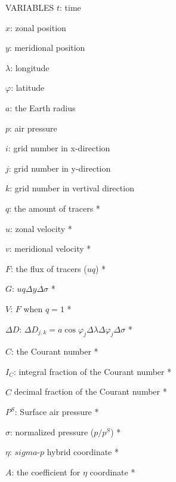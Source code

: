 VARIABLES
$t$: time

$x$: zonal position                                                        

$y$: meridional position                                                   

$\lambda$: longitude             

$\varphi$: latitude                                                      

$a$: the Earth radius                                                       

$p$: air pressure                                                        

$i$: grid number in x-direction                                            

$j$: grid number in y-direction                                            

$k$: grid number in vertival direction                                      

$q$: the amount of tracers *                                               

$u$: zonal velocity *                                                      

$v$: meridional velocity *                                                  

$F$: the flux of tracers ($uq$) *                                           

$G$: $uq\Delta y \Delta \sigma$ *                                           

$V$: $F$ when $q=1$ *

$\Delta D$: $\Delta D_{j,k}=a \cos \varphi_{j}\Delta \lambda \Delta \varphi_{j} \Delta \sigma$ *                               

$C$: the Courant number *                                             

$I_{C}$: integral fraction of the Courant number *                          

$\hat{C}$ decimal fraction of the Courant number *                         

$P^{S}$: Surface air pressure *                                         

$\sigma$: normalized pressure ($p/p^{S}$) *                               

$\eta$: $sigma$-$p$ hybrid coordinate *                              

$A$: the coefficient for $\eta$ coordinate *                               

